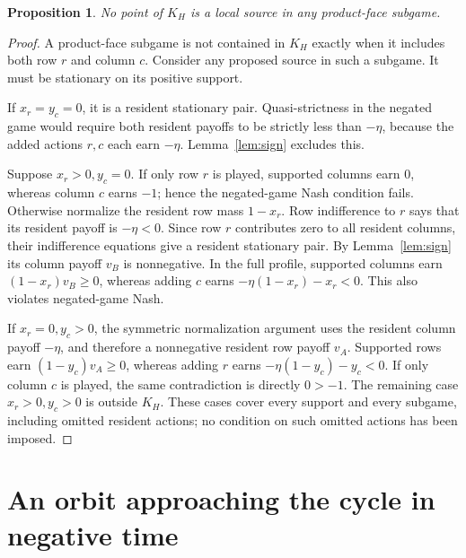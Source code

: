 \documentclass[11pt,a4paper]{article}
\numberwithin{equation}{section}
\newtheorem{proposition}[theorem]{Proposition}
\theoremstyle{definition}
\begin{document}
\begin{proposition}\label{prop:nosource}
No point of \(K_H\) is a local source in any product-face subgame.
\end{proposition}
\begin{proof}
A product-face subgame is not contained in \(K_H\) exactly when it includes
both row \(r\) and column \(c\). Consider any proposed source in
such a subgame. It must be stationary on its positive support.

If \(x_r=y_c=0\), it is a resident stationary pair. Quasi-strictness
in the negated game would require both resident payoffs to be strictly
less than \(-\eta\), because the added actions \(r,c\) each earn
\(-\eta\). Lemma~\ref{lem:sign} excludes this.

Suppose \(x_r>0,y_c=0\). If only row \(r\) is played, supported
columns earn 0, whereas column \(c\) earns \(-1\); hence the
negated-game Nash condition fails. Otherwise normalize the resident
row mass \(1-x_r\). Row indifference to \(r\) says that its resident
payoff is \(-\eta<0\). Since row \(r\) contributes zero to all
resident columns, their indifference equations give a resident
stationary pair. By Lemma~\ref{lem:sign} its column payoff \(v_B\)
is nonnegative. In the full profile, supported columns earn
\((1-x_r)v_B\ge0\), whereas adding \(c\) earns
\(-\eta(1-x_r)-x_r<0\). This also violates negated-game Nash.

If \(x_r=0,y_c>0\), the symmetric normalization argument uses the
resident column payoff \(-\eta\), and therefore a nonnegative
resident row payoff \(v_A\). Supported rows earn
\((1-y_c)v_A\ge0\), whereas adding \(r\) earns
\(-\eta(1-y_c)-y_c<0\). If only column \(c\) is played, the same
contradiction is directly \(0>-1\).
The remaining case \(x_r>0,y_c>0\) is outside \(K_H\). These cases
cover every support and every subgame, including omitted resident
actions; no condition on such omitted actions has been imposed.
\end{proof}

\section{An orbit approaching the cycle in negative time}\label{sec:orbit}
\end{document}
